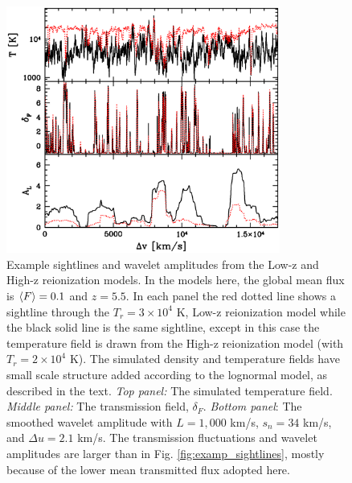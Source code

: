 \begin{figure}
\bc
\includegraphics[width=9cm]{f13.eps}
\caption{Example sightlines and wavelet amplitudes from the Low-z and High-z reionization models. In the models here, the global mean flux
is $\langle F \rangle=0.1$ and $z=5.5$. In each panel the red dotted
line shows a sightline through the $T_r=3 \times 10^4$ K, Low-z reionization model while the black solid line is the same sightline,
except in this case the temperature field is drawn from the
High-z reionization model (with $T_r = 2 \times 10^4$ K). The simulated density and temperature fields have small scale structure
added according to the lognormal model, as described in the text. {\it Top panel:} The simulated temperature field. {\it Middle panel:}
The transmission field, $\delta_F$. {\it Bottom panel}: The smoothed wavelet amplitude with $L=1,000$ km/s, $s_n=34$ km/s, and
$\Delta u=2.1$ km/s. The transmission fluctuations and wavelet amplitudes are larger than in Fig. \ref{fig:examp_sightlines}, mostly because
of the lower mean transmitted flux adopted here.}
\label{fig:examp_wave}
\ec
\end{figure}


